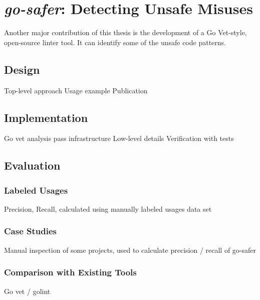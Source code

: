 \chapter{\textit{go-safer}: Detecting Unsafe Misuses}\label{ch:go-safer}

Another major contribution of this thesis is the development of a Go Vet-style, open-source linter tool.
It can identify some of the unsafe code patterns.




\section{Design}

Top-level approach
Usage example
Publication




\section{Implementation}

Go vet analysis pass infrastructure
Low-level details
Verification with tests


\section{Evaluation}

\subsection{Labeled Usages}

Precision, Recall, calculated using manually labeled usages data set


\subsection{Case Studies}

Manual inspection of some projects, used to calculate precision / recall of go-safer


\subsection{Comparison with Existing Tools}

Go vet / golint
